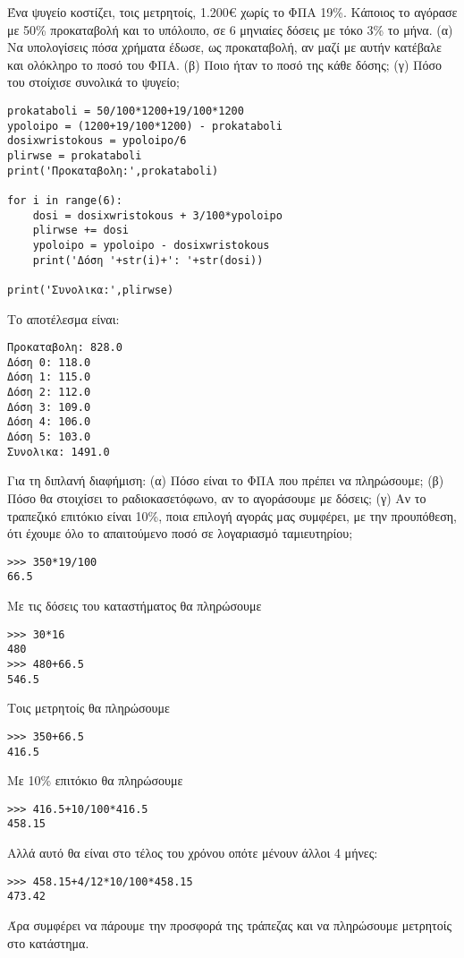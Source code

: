 \begin{exercise}
Ένα ψυγείο κοστίζει, τοις μετρητοίς, 1.200€ χωρίς το ΦΠΑ 19\%. Κάποιος το αγόρασε με 50\%
προκαταβολή και το υπόλοιπο, σε 6 μηνιαίες δόσεις με τόκο 3\% το μήνα. (α) Να υπολογίσεις
πόσα χρήματα έδωσε, ως προκαταβολή, αν μαζί με αυτήν κατέβαλε και ολόκληρο το ποσό του
ΦΠΑ. (β) Ποιο ήταν το ποσό της κάθε δόσης; (γ) Πόσο του στοίχισε συνολικά το ψυγείο;
\end{exercise}

\begin{lstlisting}
prokataboli = 50/100*1200+19/100*1200
ypoloipo = (1200+19/100*1200) - prokataboli
dosixwristokous = ypoloipo/6
plirwse = prokataboli
print('Προκαταβολη:',prokataboli)

for i in range(6):
    dosi = dosixwristokous + 3/100*ypoloipo
    plirwse += dosi
    ypoloipo = ypoloipo - dosixwristokous
    print('Δόση '+str(i)+': '+str(dosi))

print('Συνολικα:',plirwse)
\end{lstlisting}

Το αποτέλεσμα είναι:
\begin{lstlisting}
Προκαταβολη: 828.0
Δόση 0: 118.0
Δόση 1: 115.0
Δόση 2: 112.0
Δόση 3: 109.0
Δόση 4: 106.0
Δόση 5: 103.0
Συνολικα: 1491.0
\end{lstlisting}
\begin{exercise}
Για τη διπλανή διαφήμιση: (α) Πόσο είναι το ΦΠΑ που πρέπει να
πληρώσουμε; (β) Πόσο θα στοιχίσει το ραδιοκασετόφωνο, αν το
αγοράσουμε με δόσεις; (γ) Αν το τραπεζικό επιτόκιο είναι 10\%,
ποια επιλογή αγοράς μας συμφέρει, με την προυπόθεση, ότι
έχουμε όλο το απαιτούμενο ποσό σε λογαριασμό ταμιευτηρίου;
\end{exercise}
\begin{lstlisting}
>>> 350*19/100
66.5
\end{lstlisting}
Με τις δόσεις του καταστήματος θα πληρώσουμε
\begin{lstlisting}
>>> 30*16
480
>>> 480+66.5
546.5
\end{lstlisting}

Τοις μετρητοίς θα πληρώσουμε 
\begin{lstlisting}
>>> 350+66.5
416.5
\end{lstlisting}
Με 10\% επιτόκιο θα πληρώσουμε
\begin{lstlisting}
>>> 416.5+10/100*416.5
458.15
\end{lstlisting}
Αλλά αυτό θα είναι στο τέλος του χρόνου οπότε μένουν άλλοι 4 μήνες:
\begin{lstlisting}
>>> 458.15+4/12*10/100*458.15
473.42
\end{lstlisting}
Άρα συμφέρει να πάρουμε την προσφορά της τράπεζας και να πληρώσουμε μετρητοίς στο κατάστημα.


